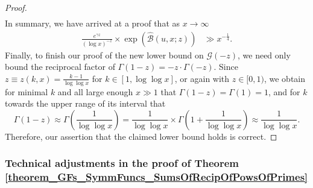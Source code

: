 \documentclass[11pt,reqno,a4letter]{article}
\numberwithin{figure}{section}
\numberwithin{table}{section}
\theoremstyle{plain}
\numberwithin{theorem}{section}
\theoremstyle{definition}
\begin{document}
\begin{proof}
\begin{align*}
\end{align*} 
In summary, we have arrived at a proof that 
as $x \rightarrow \infty$
\begin{align} 
\label{eqn_proof_tag_simpl_v1} 
\frac{e^{\gamma z}}{(\log x)^{-z}} \times \exp\left(\widehat{\mathcal{B}}(u, x; z)\right) & \gg 
     x^{-\frac{1}{4}}. 
\end{align} 
Finally, to finish our proof of the new lower bound on $\mathcal{G}(-z)$, 
we need only bound the reciprocal factor of $\Gamma(1-z) = -z \cdot \Gamma(-z)$. 
Since $z \equiv z(k, x) = \frac{k-1}{\log\log x}$ for 
$k \in [1, \log\log x]$, or again with $z \in [0, 1)$, 
we obtain for minimal $k$ and all large enough $x \gg 1$ that 
$\Gamma(1-z) = \Gamma(1) = 1$, and for $k$ towards the upper range of 
its interval that 
\[
\Gamma(1-z) \approx \Gamma\left(\frac{1}{\log\log x}\right) = 
     \frac{1}{\log\log x} \times \Gamma\left(1 + \frac{1}{\log\log x}\right) 
     \approx \frac{1}{\log\log x}. 
\]
Therefore, our assertion that the claimed lower bound holds is correct. 
\end{proof} 

\subsubsection{Technical adjustments in the proof of Theorem \ref{theorem_GFs_SymmFuncs_SumsOfRecipOfPowsOfPrimes}} 
\label{subsubSection_remark_TechAdjustments_theorem_HatPi_ExtInTermsOfGz_TO_GFs_SymmFuncs_SumsOfRecipOfPowsOfPrimes} 
\end{document}
